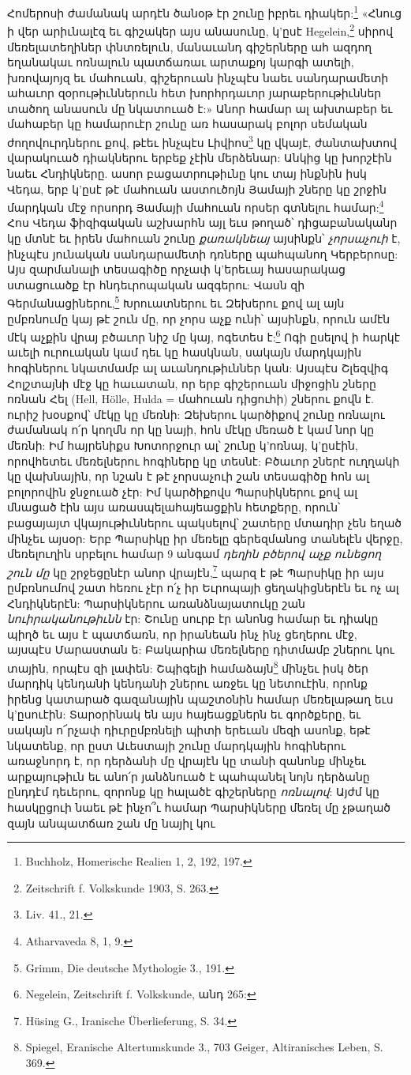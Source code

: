 \documentclass{article}
\begin{document}
{Հոմերոսի ժամանակ արդէն ծանօթ էր շունը իբրեւ դիակեր:\footnote{Buchholz, Homerische Realien 1, 2, 192, 197.} «Հնուց ի վեր արիւնալէզ եւ գիշակեր այս անասունը, կ'ըսէ Hegelein,\footnote{Zeitschrift f. Volkskunde 1903, S. 263.} սիրով մեռելատեղիներ փնտռելուն, մանաւանդ գիշերները ահ ազդող եղանակաւ ոռնալուն պատճառաւ արտաքոյ կարգի ատելի, խռովայոյզ եւ մահուան, գիշերուան ինչպէս նաեւ սանդարամետի ահաւոր զօրութիւններուն հետ խորհրդաւոր յարաբերութիւններ տածող անասուն մը նկատուած է:» Անոր համար ալ ախտաբեր եւ մահաբեր կը համարուէր շունը առ հասարակ բոլոր սեմական ժողովուրդներու քով, թէեւ ինչպէս Լիվիոս\footnote{Liv. 41., 21.} կը վկայէ, ժանտախտով վարակուած դիակներու երբեք չէին մերձենար: Անկից կը խորշէին նաեւ Հնդիկները. ասոր բացատրութիւնը կու տայ ինքնին իսկ Վեդա, երբ կ'ըսէ թէ մահուան աստուծոյն Յամայի շները կը շրջին մարդկան մէջ որսորդ Յամայի մահուան որսեր գտնելու համար:\footnote{Atharvaveda 8, 1, 9.} Հոս Վեդա ֆիզիգական աշխարհն այլ եւս թողած՝ դիցաբանականր կը մտնէ եւ իրեն մահուան շունը \emph{քառակնեայ} այսինքն՝ \emph{չորսաչուի} է, ինչպէս յունական սանդարամետի դռները պահպանող Կերբերոսը: Այս զարմանալի տեսագիծը որչափ կ'երեւայ հասարակաց ստացուածք էր հնդեւրոպական ազգերու: Վասն զի Գերմանացիներու,\footnote{Grimm, Die deutsche Mythologie 3., 191.} Խրուատներու եւ Զեխերու քով ալ այն ըմբռնումը կայ թէ շուն մը, որ չորս աչք ունի՝ այսինքն, որուն ամէն մէկ աչքին վրայ բծաւոր նիշ մը կայ, ոգետես է:\footnote{Negelein, Zeitschrift f. Volkskunde, անդ 265:} Ոգի ըսելով ի հարկէ աւելի ուրուական կամ դեւ կը հասկնան, սակայն մարդկային հոգիներու նկատմամբ ալ աւանդութիւններ կան: Այսպէս Շլեզվիգ Հոլշտայնի մէջ կը հաւատան, որ երբ գիշերուան միջոցին շները ոռնան Հել (Hell, Hölle, Hulda = մահուան դիցուհի) շներու քովն է. ուրիշ խօսքով՝ մէկը կը մեռնի: Զեխերու կարծիքով շունը ոռնալու ժամանակ ո՛ր կողմն որ կը նայի, հոն մէկը մեռած է կամ նոր կը մեռնի: Իմ հայրենիքս Խոտորջուր ալ՝ շունը կ'ոռնայ, կ'ըսէին, որովհետեւ մեռելներու հոգիները կը տեսնէ: Բծաւոր շներէ ուղղակի կը վախնային, որ նշան է թէ չորսաչուի շան տեսագիծը հոն ալ բոլորովին ջնջուած չէր: Իմ կարծիքովս Պարսիկներու քով ալ մնացած էին այս առասպելահայեացքին հետքերը, որուն՝ բացայայտ վկայութիւններու պակսելով՝ շատերը մտադիր չեն եղած մինչեւ այսօր: Երբ Պարսիկը իր մեռելը գերեզմանոց տանելէն վերջը, մեռելուղին սրբելու համար 9 անգամ \emph{դեղին բծերով աչք ունեցող շուն մը} կը շրջեցընէր անոր վրայէն,\footnote{Hüsing G., Iranische Überlieferung, S. 34.} պարզ է թէ Պարսիկը իր այս ըմբռնումով շատ հեռու չէր ո՛չ իր Եւրոպայի ցեղակիցներէն եւ ոչ ալ Հնդիկներէն: Պարսիկներու առանձնայատուկը շան \emph{նուիրականութիւնն} էր: Շունը սուրբ էր անոնց համար եւ դիակը պիղծ եւ այս է պատճառն, որ իրանեան ինչ ինչ ցեղերու մէջ, այսպէս Մարաստան ե: Բակարիա մեռելները դիտմամբ շներու կու տային, որպէս զի լափեն: Շպիգելի համաձայն\footnote{Spiegel, Eranische Altertumskunde 3., 703 Geiger, Altiranisches Leben, S. 369.} մինչեւ իսկ ծեր մարդիկ կենդանի կենդանի շներու առջեւ կը նետուէին, որոնք իրենց կատարած գազանային պաշտօնին համար մեռելաթաղ եւս կ'ըսուէին: Տարօրինակ են այս հայեացքներն եւ գործքերը, եւ սակայն ո՜րչափ դիւրըմբռնելի պիտի երեւան մեզի ասոնք, եթէ նկատենք, որ ըստ Աւեստայի շունը մարդկային հոգիներու առաջնորդ է, որ դերձանի մը վրայէն կը տանի զանոնք մինչեւ արքայութիւն եւ անո՛ր յանձնուած է պահպանել նոյն դերձանը ընդդէմ դեւերու, զորոնք կը հալածէ գիշերները \emph{ոռնալով}: Այժմ կը հասկըցուի նաեւ թէ ինչո՞ւ համար Պարսիկները մեռել մը չթաղած զայն անպատճառ շան մը նայիլ կու }
\end{document}
